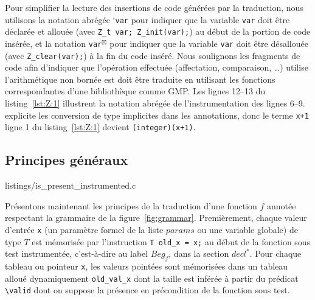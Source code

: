 Pour simplifier la lecture des insertions de code générées par la traduction,
nous utilisons la notation abrégée ${}^{\square}$\lstinline{var} pour indiquer
que la variable \lstinline{var} doit être déclarée et allouée (avec
\lstinline{Z_t var; Z_init(var);}) au début de la portion de code insérée, et la
notation \lstinline{var}${}^{\boxtimes}$ pour indiquer que la variable
\lstinline{var} doit être désallouée (avec \lstinline{Z_clear(var);})
à la fin du code inséré.
Nous soulignons les fragments de code afin d'indiquer que l'opération effectuée
(affectation, comparaison, \dots) utilise l'arithmétique non bornée est doit
être traduite en utilisant les fonctions correspondantes d'une bibliothèque
comme GMP.
Les lignes 12--13 du listing~\ref{lst:Z:1} illustrent la notation abrégée de 
l'instrumentation des lignes 6--9.
\framac explicite les conversion de type implicites dans les annotations, donc
le terme \lstinline'x+1' ligne 1 du listing~\ref{lst:Z:1} devient
\lstinline'(integer)(x+1)'.


\subsection{Principes généraux}
\label{sec:principles}



                {listings/is_present_instrumented.c}


Présentons maintenant les principes de la traduction d'une fonction $f$ annotée
respectant la grammaire de la figure~\ref{fig:grammar}.
Premièrement, chaque valeur d'entrée \lstinline'x' (un paramètre formel de la
liste $params$ ou une variable globale) de type $T$ est mémorisée par
l'instruction \lstinline|T old_x = x;| au début de la fonction sous test
instrumentée, c'est-à-dire au label $Beg_f$, dans la section $decl^*$.
Pour chaque tableau ou pointeur \lstinline'x', les valeurs pointées sont
mémorisées dans un tableau alloué dynamiquement \lstinline'old_val_x' dont la
taille est inférée à partir du prédicat \lstinline'\valid' dont on suppose la
présence en précondition de la fonction sous test.

